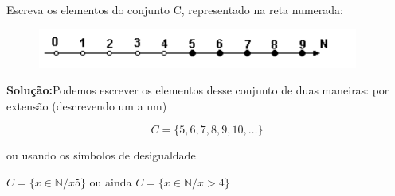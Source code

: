\begin{texemplo}
Escreva os elementos do conjunto C, representado na reta numerada:

\begin{figure}[H]
	\begin{Center}
		\includegraphics[width=4.17in,height=0.51in]{capitulos/conjuntos_numericos/media/image5.pdf}
	\end{Center}
\end{figure}

\textbf{Solução:}\quad Podemos escrever os elementos desse conjunto de duas maneiras: por extensão (descrevendo um a um) 

$$ C=\{5,6,7,8,9,10,\dots\}$$

\quad ou usando os símbolos de desigualdade  

\quad $C= \{ x \in \mathbb{N} / x  5 \}$ ou ainda $C= \{ x \in \mathbb{N} / x > 4 \}$ \qedsymbol{}
\end{texemplo}

